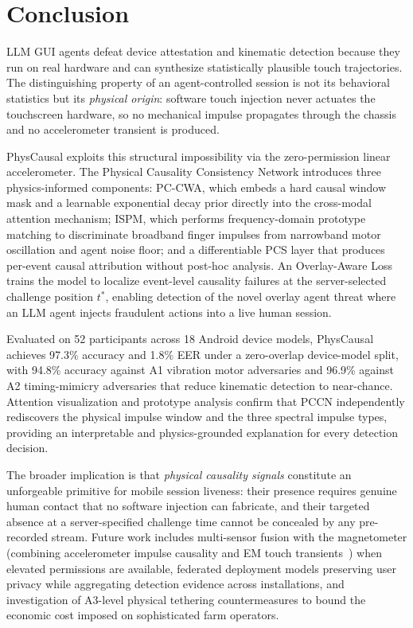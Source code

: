 \section{Conclusion}
\label{sec:conclusion}

LLM GUI agents defeat device attestation and kinematic detection because they run on
real hardware and can synthesize statistically plausible touch trajectories.%
The distinguishing property of an agent-controlled session is not its behavioral
statistics but its \textit{physical origin}: software touch injection never actuates
the touchscreen hardware, so no mechanical impulse propagates through the chassis
and no accelerometer transient is produced.%

PhysCausal exploits this structural impossibility via the zero-permission linear
accelerometer.%
The Physical Causality Consistency Network introduces three physics-informed components:
PC-CWA, which embeds a hard causal window mask and a learnable exponential decay prior
directly into the cross-modal attention mechanism; ISPM, which performs frequency-domain
prototype matching to discriminate broadband finger impulses from narrowband motor
oscillation and agent noise floor; and a differentiable PCS layer that produces
per-event causal attribution without post-hoc analysis.%
An Overlay-Aware Loss trains the model to localize event-level causality failures
at the server-selected challenge position $t^*$, enabling detection of the novel
overlay agent threat where an LLM agent injects fraudulent actions into a live human session.%

Evaluated on 52 participants across 18 Android device models, PhysCausal achieves
97.3\% accuracy and 1.8\% EER under a zero-overlap device-model split,
with 94.8\% accuracy against A1 vibration motor adversaries and 96.9\% against
A2 timing-mimicry adversaries that reduce kinematic detection to near-chance.%
Attention visualization and prototype analysis confirm that PCCN independently
rediscovers the physical impulse window and the three spectral impulse types,
providing an interpretable and physics-grounded explanation for every detection decision.%

The broader implication is that \textit{physical causality signals} constitute an
unforgeable primitive for mobile session liveness: their presence requires genuine
human contact that no software injection can fabricate, and their targeted absence
at a server-specified challenge time cannot be concealed by any pre-recorded stream.%
Future work includes multi-sensor fusion with the magnetometer (combining accelerometer
impulse causality and EM touch transients~\cite{istelan2023}) when elevated permissions
are available, federated deployment models preserving user privacy while aggregating
detection evidence across installations, and investigation of A3-level physical
tethering countermeasures to bound the economic cost imposed on sophisticated
farm operators.%
